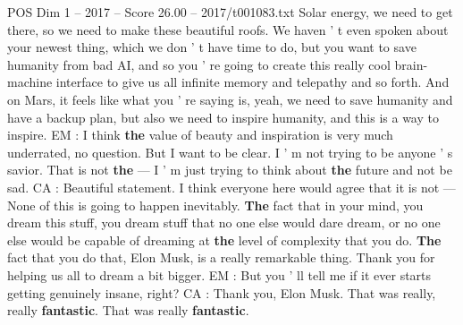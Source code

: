 \begin{textsample}{POS Dim 1 – 2017 – Score 26.00 – 2017/t001083.txt}
Solar energy, we need to get there, so we need to make these beautiful roofs.
We haven ' t even spoken about your newest thing, which we don ' t have time to do, but you want to save humanity from bad AI, and so you ' re going to create this really cool brain-machine interface to give us all infinite memory and telepathy and so forth.
And on Mars, it feels like what you ' re saying is, yeah, we need to save humanity and have a backup plan, but also we need to inspire humanity, and this is a way to inspire.
EM : I think \textbf{the} value of beauty and inspiration is very much underrated, no question.
But I want to be clear.
I ' m not trying to be anyone ' s savior.
That is not \textbf{the} — I ' m just trying to think about \textbf{the} future and not be sad.
CA : Beautiful statement.
I think everyone here would agree that it is not — None of this is going to happen inevitably. \textbf{The} fact that in your mind, you dream this stuff, you dream stuff that no one else would dare dream, or no one else would be capable of dreaming at \textbf{the} level of complexity that you do. \textbf{The} fact that you do that, Elon Musk, is a really remarkable thing.
Thank you for helping us all to dream a bit bigger.
EM : But you ' ll tell me if it ever starts getting genuinely insane, right?
CA : Thank you, Elon Musk.
That was really, really \textbf{fantastic}.
That was really \textbf{fantastic}.

\end{textsample}
